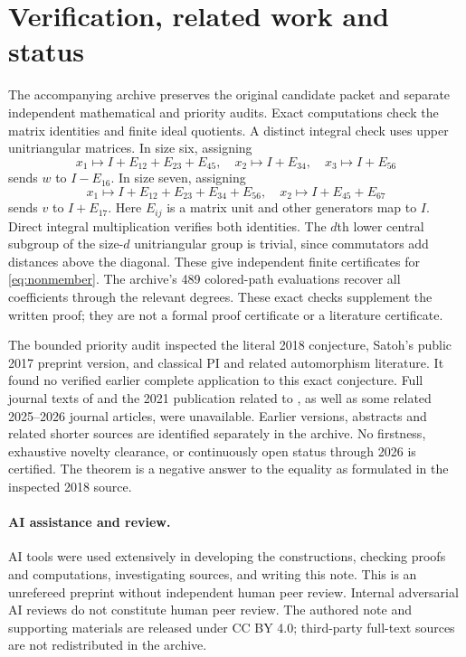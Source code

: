 \documentclass[11pt,letterpaper]{article}
\begin{document}
\section{Verification, related work and status}
The accompanying archive preserves the original candidate packet and separate
independent mathematical and priority audits. Exact computations check the
matrix identities and finite ideal quotients. A distinct integral check uses
upper unitriangular matrices. In size six, assigning
\[
 x_1\mapsto I+E_{12}+E_{23}+E_{45},\quad
 x_2\mapsto I+E_{34},\quad x_3\mapsto I+E_{56}
\]
sends $w$ to $I-E_{16}$. In size seven, assigning
\[
 x_1\mapsto I+E_{12}+E_{23}+E_{34}+E_{56},\quad
 x_2\mapsto I+E_{45}+E_{67}
\]
sends $v$ to $I+E_{17}$. Here $E_{ij}$ is a matrix unit and other generators
map to $I$. Direct integral multiplication verifies both identities.
The $d$th lower central subgroup of the size-$d$ unitriangular group is
trivial, since commutators add distances above the diagonal. These give
independent finite certificates for \eqref{eq:nonmember}.
The archive's 489 colored-path evaluations recover all coefficients through
the relevant degrees. These exact checks supplement the written proof;
they are not a formal proof certificate or a literature certificate.

The bounded priority audit inspected the literal 2018 conjecture, Satoh's
public 2017 preprint version, and classical PI and related automorphism
literature. It found no verified earlier complete application to this exact
conjecture. Full journal texts of \cite{Satoh2017} and the 2021 publication
related to \cite{SatohPreprint}, as well as some related 2025--2026 journal
articles, were unavailable. Earlier versions, abstracts and related shorter
sources are identified separately in the archive. No firstness, exhaustive
novelty clearance, or continuously open status through 2026 is certified.
The theorem is a negative answer to the equality as formulated in the
inspected 2018 source.

\paragraph{AI assistance and review.}
AI tools were used extensively in developing the constructions, checking
proofs and computations, investigating sources, and writing this note.
This is an unrefereed preprint without independent human peer review.
Internal adversarial AI reviews do not constitute human peer review.
The authored note and supporting materials are released under CC BY 4.0;
third-party full-text sources are not redistributed in the archive.
\end{document}
